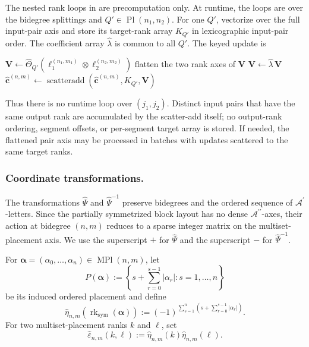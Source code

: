 \documentclass{amsart}
\theoremstyle{definition}
\theoremstyle{remark}
\begin{document}
\begin{implrmk}
The nested rank loops in
 are precomputation only. At
runtime, the loops are over the bidegree splittings and
$Q'\in\operatorname{Pl}(n_1,n_2)$. For one $Q'$, vectorize over the full
input-pair axis and store its target-rank array $K_{Q'}$ in lexicographic
input-pair order. The coefficient array $\widehat{\lambda}$ is common to all
$Q'$. The keyed update is
\begin{algorithmic}[1]
\State $\mathbf{V}\gets
    \widehat{\Theta}_{Q'}
    \left(
        \ell_1^{(n_1,m_1)}
        \otimes
        \ell_2^{(n_2,m_2)}
    \right)$
\State flatten the two rank axes of $\mathbf{V}$
\State $\mathbf{V}\gets\widehat{\lambda}\,\mathbf{V}$
\State $\widehat{\mathbf{c}}^{(n,m)}\gets
    \operatorname{scatteradd}
    \left(
        \widehat{\mathbf{c}}^{(n,m)},K_{Q'},\mathbf{V}
    \right)$
\end{algorithmic}
Thus there is no runtime loop over $(j_1,j_2)$. Distinct input pairs that
have the same output rank are accumulated by the scatter-add itself; no
output-rank ordering, segment offsets, or per-segment target array is stored.
If needed, the flattened pair axis may be processed in batches with updates
scattered to the same target ranks.
\end{implrmk}

\subsubsection{Coordinate transformations.}
\label{sec:symmetrized_transformations}

The transformations $\widehat{\Psi}$ and
$\widehat{\Psi}^{-1}$ preserve bidegrees and the ordered sequence of
$\mathcal{A}^{\prime}$-letters. Since the partially symmetrized block
layout has no dense $\mathcal{A}^{\prime\prime}$-axes, their action at
bidegree $(n,m)$ reduces to a sparse integer matrix on the
multiset-placement axis. We use the superscript $+$ for
$\widehat{\Psi}$ and the superscript $-$ for
$\widehat{\Psi}^{-1}$.

For
$\boldsymbol{\alpha}
=(\alpha_0,\ldots,\alpha_n)
\in\operatorname{MPl}(n,m)$,
let
\[
    P(\boldsymbol{\alpha})
    :=
    \left\{
        s+\sum_{r=0}^{s-1}|\alpha_r|
        :
        s=1,\ldots,n
    \right\}
\]
be its induced ordered placement and define
\[
    \widehat{\eta}_{n,m}
    \left(
        \operatorname{rk}_{\mathrm{sym}}
        (\boldsymbol{\alpha})
    \right)
    :=
    (-1)^{
        \sum_{s=1}^{n}
        \left(
            s+\sum_{r=0}^{s-1}|\alpha_r|
        \right)
    }.
\]
For two multiset-placement ranks $k$ and $\ell$, set
\[
    \widehat{\varepsilon}_{n,m}(k,\ell)
    :=
    \widehat{\eta}_{n,m}(k)
    \widehat{\eta}_{n,m}(\ell).
\]
\end{document}
